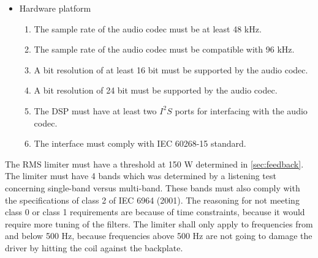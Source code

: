 \begin{itemize}
\item Hardware platform
\begin{enumerate}
\item [\textlabel{4}{samplerate44}] The sample rate of the audio codec must be at least 48 kHz.\\
\item [\textlabel{5}{samplerate96}] The sample rate of the audio codec must be compatible with 96 kHz.\\
\item [\textlabel{6}{resolution16}]  A bit resolution of  at least 16 bit must be supported by the audio codec.\\
\item [\textlabel{7}{resolution}]  A bit resolution of 24 bit must be supported by the audio codec.\\
\item [\textlabel{8}{I2S}] The DSP must have at least two $I^2S$ ports for interfacing with the audio codec.\\
\item [\textlabel{9}{IEC}] The interface must comply with IEC 60268-15 standard.
\end{enumerate}
\end{itemize}


The RMS limiter must have a threshold at 150 W determined in \autoref{sec:feedback}. The limiter must have 4 bands which was determined by a listening test concerning single-band versus multi-band. These bands must also comply with the specifications of class 2 of IEC 6964 (2001). The reasoning for not meeting class 0 or class 1 requirements are because of time constraints, because it would require more tuning of the filters. The limiter shall only apply to frequencies from and below 500 Hz, because frequencies above 500 Hz are not going to damage the driver by hitting the coil against the backplate. 

